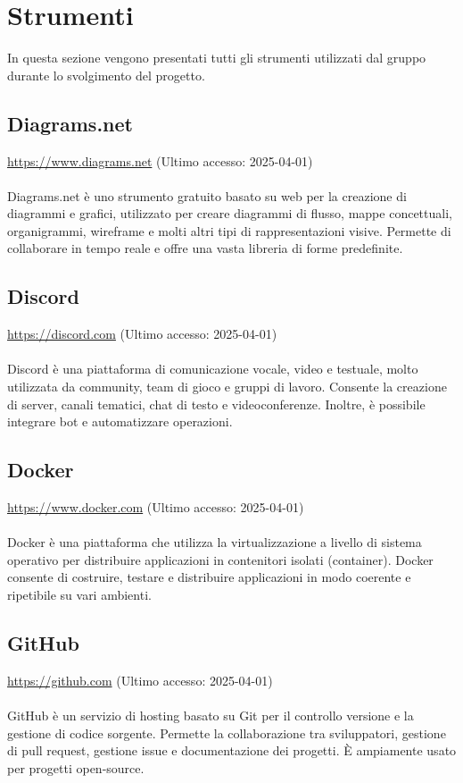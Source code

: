 \section{Strumenti}
In questa sezione vengono presentati tutti gli strumenti utilizzati dal gruppo durante lo svolgimento del progetto.

\subsection{Diagrams.net}
\label{Diagrams.net}
\href{https://www.diagrams.net}{https://www.diagrams.net} (Ultimo accesso: 2025-04-01) \\ \\  
Diagrams.net è uno strumento gratuito basato su web per la creazione di diagrammi e grafici, utilizzato per creare diagrammi di flusso, mappe concettuali, organigrammi, wireframe e molti altri tipi di rappresentazioni visive. Permette di collaborare in tempo reale e offre una vasta libreria di forme predefinite.

\subsection{Discord}
\label{Discord}
\href{https://discord.com}{https://discord.com} (Ultimo accesso: 2025-04-01) \\ \\  
Discord è una piattaforma di comunicazione vocale, video e testuale, molto utilizzata da community, team di gioco e gruppi di lavoro. Consente la creazione di server, canali tematici, chat di testo e videoconferenze. Inoltre, è possibile integrare bot e automatizzare operazioni.

\subsection{Docker}
\label{Docker}
\href{https://www.docker.com}{https://www.docker.com} (Ultimo accesso: 2025-04-01) \\ \\  
Docker è una piattaforma che utilizza la virtualizzazione a livello di sistema operativo per distribuire applicazioni in contenitori isolati (container). Docker consente di costruire, testare e distribuire applicazioni in modo coerente e ripetibile su vari ambienti.

\subsection{GitHub}
\label{GitHub}
\href{https://github.com}{https://github.com} (Ultimo accesso: 2025-04-01) \\ \\  
GitHub è un servizio di hosting basato su Git per il controllo versione e la gestione di codice sorgente. Permette la collaborazione tra sviluppatori, gestione di pull request, gestione issue e documentazione dei progetti. È ampiamente usato per progetti open-source.


